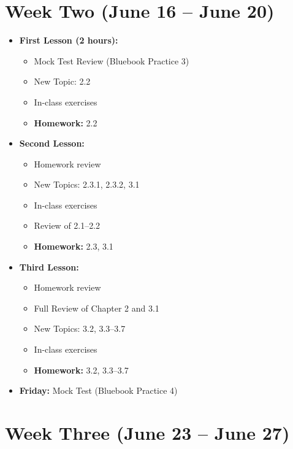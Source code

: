 \documentclass{article}
\begin{document}
\newpage

\section*{Week Two (June 16 -- June 20)}

\begin{itemize}[leftmargin=*]
    \item \textbf{First Lesson (2 hours):}
    \begin{itemize}
        \item Mock Test Review (Bluebook Practice 3)
        \item New Topic: 2.2
        \item In-class exercises
        \item \textbf{Homework:} 2.2
    \end{itemize}
    \item \textbf{Second Lesson:}
    \begin{itemize}
        \item Homework review
        \item New Topics: 2.3.1, 2.3.2, 3.1
        \item In-class exercises
        \item Review of 2.1--2.2
        \item \textbf{Homework:} 2.3, 3.1
    \end{itemize}
    \item \textbf{Third Lesson:}
    \begin{itemize}
        \item Homework review
        \item Full Review of Chapter 2 and 3.1
        \item New Topics: 3.2, 3.3--3.7
        \item In-class exercises
        \item \textbf{Homework:} 3.2, 3.3--3.7
    \end{itemize}
    \item \textbf{Friday:} Mock Test (Bluebook Practice 4)
\end{itemize}

\newpage

\section*{Week Three (June 23 -- June 27)}
\end{document}
